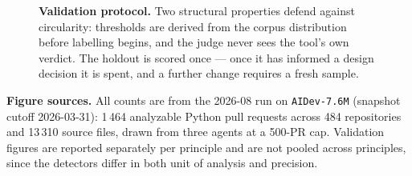 \documentclass[11pt]{article}
\begin{document}
\begin{figure}[h]
{\begin{tikzpicture}[node distance=8mm]
\end{tikzpicture}}
\caption{\textbf{Validation protocol.} Two structural properties defend against circularity:
thresholds are derived from the corpus distribution before labelling begins, and the judge
never sees the tool's own verdict. The holdout is scored once --- once it has informed a design
decision it is spent, and a further change requires a fresh sample.}
\end{figure}

\vspace{4mm}
\noindent\textbf{Figure sources.} All counts are from the 2026-08 run on
\texttt{AIDev-7.6M} (snapshot cutoff 2026-03-31): 1\,464 analyzable Python pull requests
across 484 repositories and 13\,310 source files, drawn from three agents at a 500-PR cap.
Validation figures are reported separately per principle and are not pooled across principles,
since the detectors differ in both unit of analysis and precision.
\end{document}
